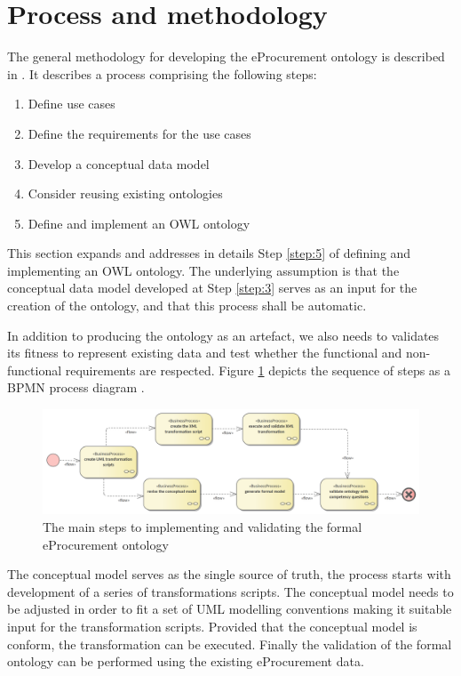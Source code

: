 \section{Process and methodology}
\label{sec:approach}
	
	The general methodology for developing the eProcurement ontology is described in \cite[3--15]{d2.01-2017}. It describes a process comprising the following steps:
	\begin{enumerate}
		\item\label{step:1} Define use cases
		\item\label{step:2} Define the requirements for the use cases
		\item\label{step:3} Develop a conceptual data model
		\item\label{step:4} Consider reusing existing ontologies
		\item\label{step:5} Define and implement an OWL ontology		
	\end{enumerate}

	This section expands and addresses in details Step \ref{step:5} of defining and implementing an OWL ontology. The underlying assumption is that the conceptual data model developed at Step \ref{step:3} serves as an input for the creation of the ontology, and that this process shall be automatic. 
	
	In addition to producing the ontology as an artefact, we also needs to validates its fitness to represent existing data and test whether the functional and non-functional requirements are respected. Figure \ref{fig:process-overview} depicts the sequence of steps as a BPMN process diagram \cite{bpmn-introduction}. 
	
	\begin{figure}[!ht]		
		\centering
		\includegraphics[width=\textwidth]{../img/processOverview.png}
		\caption{The main steps to implementing and validating the formal eProcurement ontology}
		\label{fig:process-overview}
	\end{figure}

	The conceptual model serves as the single source of truth, the process starts with development of a series of transformations scripts. The conceptual model needs to be adjusted in order to fit a set of UML modelling conventions \citep{costetchi2020b} making it suitable input for the transformation scripts. Provided that the conceptual model is conform, the transformation can be executed. Finally the validation of the formal ontology can be performed using the existing eProcurement data.
	
